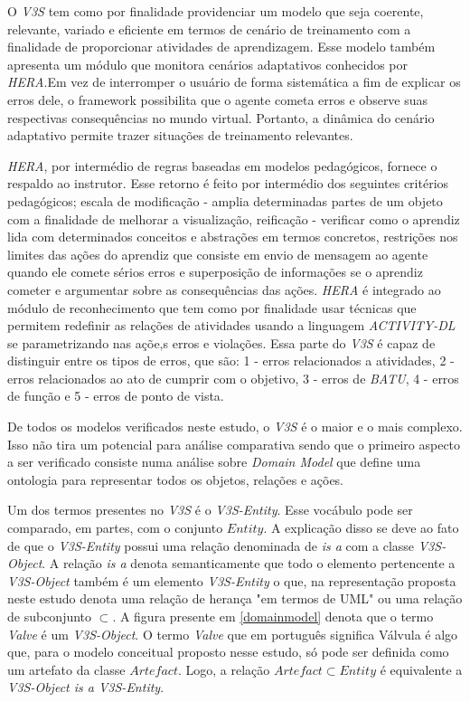 O \textit{V3S} tem como por finalidade providenciar um modelo que seja coerente, relevante, variado e eficiente em termos de cenário de treinamento com a finalidade de proporcionar atividades de aprendizagem. Esse modelo também apresenta um módulo que monitora cenários adaptativos conhecidos por \textit{HERA}.Em vez de interromper o usuário de forma sistemática a fim de explicar os erros dele, o framework possibilita que o agente cometa erros e observe suas respectivas consequências no mundo virtual. Portanto, a dinâmica do cenário adaptativo permite trazer situações de treinamento relevantes. 

\textit{HERA}, por intermédio de regras baseadas em modelos pedagógicos, fornece o respaldo ao instrutor. Esse retorno é feito por intermédio dos seguintes critérios pedagógicos; escala de modificação - amplia determinadas partes de um objeto com a finalidade de melhorar a visualização, reificação - verificar como o aprendiz lida com determinados conceitos e abstrações em termos concretos, restrições nos limites das ações do aprendiz que consiste em envio de mensagem ao agente quando ele comete sérios erros e superposição de informações se o aprendiz cometer e argumentar sobre as consequências das ações. \textit{HERA} é integrado ao módulo de reconhecimento que tem como por finalidade usar técnicas que permitem redefinir as relações de atividades usando a linguagem \textit{ACTIVITY-DL} se parametrizando nas açõe,s erros e violações. Essa parte do \textit{V3S} é capaz de distinguir entre os tipos de erros, que são: 1 - erros relacionados a atividades, 2 - erros relacionados ao ato de cumprir com o objetivo, 3 - erros de \textit{BATU}, 4 - erros de função e 5 - erros de ponto de vista.

De todos os modelos verificados neste estudo, o \textit{V3S} é o maior e o mais complexo. Isso não tira um potencial para análise comparativa sendo que o primeiro aspecto a ser verificado consiste numa análise sobre \textit{Domain Model} que define uma ontologia para representar todos os objetos, relações e ações.

Um dos termos presentes no \textit{V3S} é o \textit{V3S-Entity}. Esse vocábulo pode ser comparado, em partes, com o conjunto $ Entity $. A explicação disso se deve ao fato de que o \textit{V3S-Entity} possui uma relação denominada de \textit{is a} com a classe \textit{V3S-Object}. A relação \textit{is a} denota semanticamente que todo o elemento pertencente a \textit{V3S-Object} também é um elemento \textit{V3S-Entity} o que, na representação proposta neste estudo denota uma relação de herança "em termos de UML" ou uma relação de subconjunto $ \subset $. A figura presente em \ref{domainmodel} denota que o termo \textit{Valve} é um \textit{V3S-Object}. O termo \textit{Valve} que em português significa Válvula é algo que, para o modelo conceitual proposto nesse estudo, só pode ser definida como um artefato da classe $Artefact$. Logo, a relação $Artefact \subset Entity $ é equivalente a \textit{V3S-Object is a V3S-Entity}.


